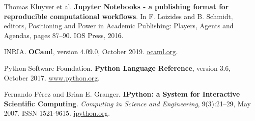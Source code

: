 \documentclass[runningheads]{llncs}
\begin{document}
%
%
% 
% 
%
\begin{thebibliography}{8}
    Thomas Kluyver et al.
    \textbf{Jupyter Notebooks - a publishing format for reproducible computational workflows}.
    In F. Loizides and B. Schmidt, editors, Positioning and Power in Academic Publishing: Players, Agents and Agendas, pages 87–90. IOS Press, 2016.

    INRIA.
    \textbf{OCaml}, version 4.09.0, October 2019. \url{ocaml.org}.

    Python Software Foundation.
    \textbf{Python Language Reference}, version 3.6, October 2017. \url{www.python.org}.

    Fernando Pérez and Brian E. Granger.
    \textbf{IPython: a System for Interactive Scientific Computing}.
    \emph{Computing in Science and Engineering}, 9(3):21–29, May 2007. ISSN 1521-9615. \url{ipython.org}.
\end{thebibliography}
\end{document}
